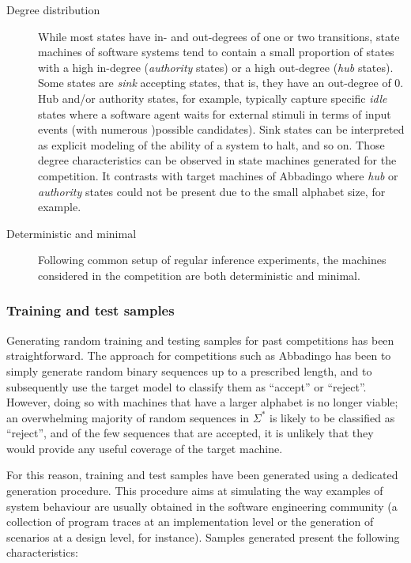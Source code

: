 \begin{description}
\item[Degree distribution] While most states have in- and out-degrees of one or two transitions, state machines of software systems tend to contain a small proportion of states with a high in-degree (\emph{authority} states) or a high out-degree (\emph{hub} states). Some states are \emph{sink} accepting states, that is, they have an out-degree of 0. Hub and/or authority states, for example, typically capture specific \emph{idle} states where a software agent waits for external stimuli in terms of input events (with numerous )possible candidates). Sink states can be interpreted as explicit modeling of the ability of a system to halt, and so on. Those degree characteristics can be observed in state machines generated for the competition. It contrasts with target machines of Abbadingo where \emph{hub} or \emph{authority} states could not be present due to the small alphabet size, for example.

\item[Deterministic and minimal] Following common setup of regular inference experiments, the machines considered in the competition are both deterministic and minimal.

\end{description}

\subsubsection{Training and test samples}

Generating random training and testing samples for past competitions has been straightforward. The approach for competitions such as Abbadingo has been to simply generate random binary sequences up to a prescribed length, and to subsequently use the target model to classify them as ``accept'' or ``reject''. However, doing so with machines that have a larger alphabet is no longer viable; an overwhelming majority of random sequences in $\Sigma^{*}$ is likely to be classified as ``reject'', and of the few sequences that are accepted, it is unlikely that they would provide any useful coverage of the target machine. 

For this reason, training and test samples have been generated using a dedicated generation procedure. This procedure aims at simulating the way examples of system behaviour are usually obtained in the software engineering community (a collection of program traces at an implementation level or the generation of scenarios at a design level, for instance). Samples generated present the following characteristics:

